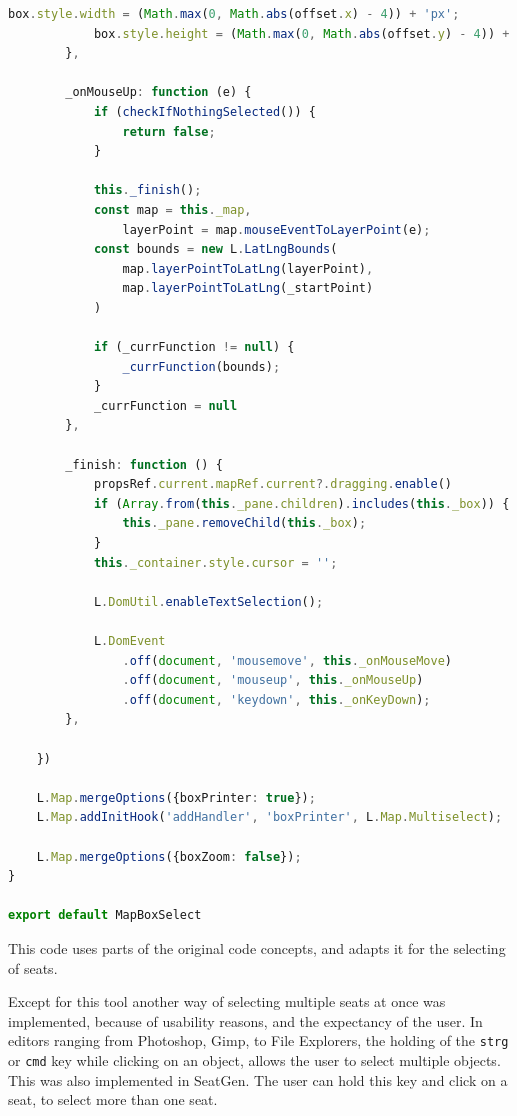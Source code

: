 \begin{lstlisting}[language=Typescript, caption={Multiselect Tool},label={lst:multiselect-tool}]
            box.style.width = (Math.max(0, Math.abs(offset.x) - 4)) + 'px';
            box.style.height = (Math.max(0, Math.abs(offset.y) - 4)) + 'px';
        },

        _onMouseUp: function (e) {
            if (checkIfNothingSelected()) {
                return false;
            }

            this._finish();
            const map = this._map,
                layerPoint = map.mouseEventToLayerPoint(e);
            const bounds = new L.LatLngBounds(
                map.layerPointToLatLng(layerPoint),
                map.layerPointToLatLng(_startPoint)
            )

            if (_currFunction != null) {
                _currFunction(bounds);
            }
            _currFunction = null
        },

        _finish: function () {
            propsRef.current.mapRef.current?.dragging.enable()
            if (Array.from(this._pane.children).includes(this._box)) {
                this._pane.removeChild(this._box);
            }
            this._container.style.cursor = '';

            L.DomUtil.enableTextSelection();

            L.DomEvent
                .off(document, 'mousemove', this._onMouseMove)
                .off(document, 'mouseup', this._onMouseUp)
                .off(document, 'keydown', this._onKeyDown);
        },

    })

    L.Map.mergeOptions({boxPrinter: true});
    L.Map.addInitHook('addHandler', 'boxPrinter', L.Map.Multiselect);

    L.Map.mergeOptions({boxZoom: false});
}

export default MapBoxSelect
\end{lstlisting}

This code uses parts of the original code concepts, and adapts it for the selecting of seats. 

Except for this tool another way of selecting multiple seats at once was implemented, because of usability reasons, and the expectancy of the user. In editors ranging from Photoshop, Gimp, to File Explorers, the holding of the \texttt{strg} or \texttt{cmd} key while clicking on an object, allows the user to select multiple objects. This was also implemented in SeatGen. The user can hold this key and click on a seat, to select more than one seat.